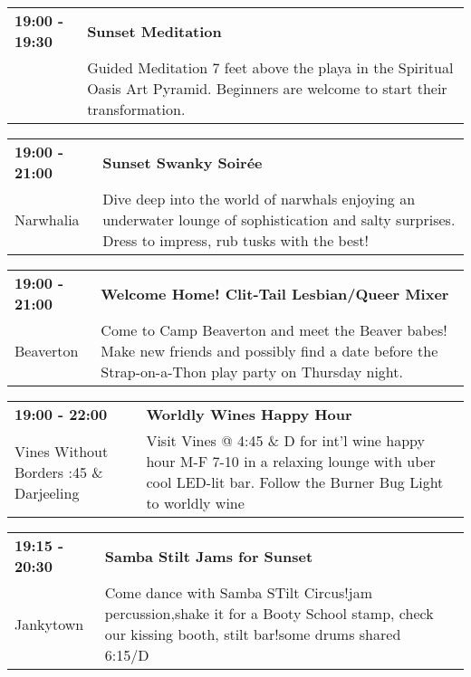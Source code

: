 \begin{tabular}{ p{1in} p{2.2in} }
    \textbf{19:00 - 19:30} & \textbf{Sunset Meditation} \\
    ~ \newline  & Guided Meditation 7 feet above the playa in the Spiritual Oasis Art Pyramid. Beginners are welcome to start their transformation. \\
    \hline 
\end{tabular}
    
\begin{tabular}{ p{1in} p{2.2in} }
    \textbf{19:00 - 21:00} & \textbf{Sunset Swanky Soir\'ee} \\
    Narwhalia \newline  & Dive deep into the world of narwhals enjoying an underwater lounge of sophistication and salty surprises. Dress to impress, rub tusks with the best! \\
    \hline 
\end{tabular}
    
\begin{tabular}{ p{1in} p{2.2in} }
    \textbf{19:00 - 21:00} & \textbf{Welcome Home! Clit-Tail Lesbian/Queer Mixer } \\
    Beaverton \newline  & Come to Camp Beaverton and meet the Beaver babes! Make new friends and possibly find a date before the Strap-on-a-Thon play party on Thursday night. \\
    \hline 
\end{tabular}
    
\begin{tabular}{ p{1in} p{2.2in} }
    \textbf{19:00 - 22:00} & \textbf{Worldly Wines Happy Hour} \\
    Vines Without Borders \newline 4:45 \& Darjeeling & Visit Vines @ 4:45 \& D for int'l wine happy hour M-F 7-10 in a relaxing lounge with uber cool LED-lit bar. Follow the Burner Bug Light to worldly wine \\
    \hline 
\end{tabular}
    
\begin{tabular}{ p{1in} p{2.2in} }
    \textbf{19:15 - 20:30} & \textbf{Samba Stilt Jams for Sunset} \\
    Jankytown \newline  & Come dance with Samba STilt Circus!jam percussion,shake it for a Booty School stamp, check our kissing booth, stilt bar!some drums shared~ 6:15/D \\
    \hline 
\end{tabular}
    
